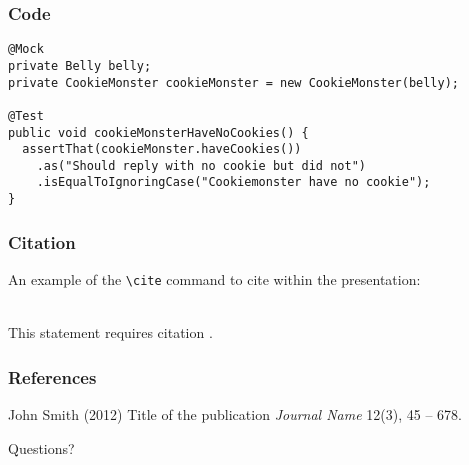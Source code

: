 \documentclass{beamer}
\begin{document}
\begin{frame}[fragile]
\frametitle{Code}
\begin{example}[Code]
\begin{lstlisting}
@Mock
private Belly belly;
private CookieMonster cookieMonster = new CookieMonster(belly);

@Test
public void cookieMonsterHaveNoCookies() {
  assertThat(cookieMonster.haveCookies())
    .as("Should reply with no cookie but did not")
    .isEqualToIgnoringCase("Cookiemonster have no cookie");
}
\end{lstlisting}
\end{example}
\end{frame}

\begin{frame}[fragile] %
\frametitle{Citation}
An example of the \verb|\cite| command to cite within the presentation:\\~

This statement requires citation \cite{p1}.
\end{frame}


\begin{frame}
\frametitle{References}
\footnotesize{
\begin{thebibliography}{99} %
 John Smith (2012)
\newblock Title of the publication
\newblock \emph{Journal Name} 12(3), 45 -- 678.
\end{thebibliography}
}
\end{frame}


\begin{frame}
\Huge{\centerline{Questions?}}
\end{frame}

\end{document}
